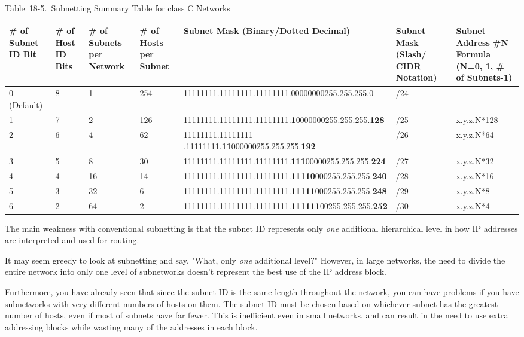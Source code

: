\documentclass[b5paper,11pt]{memoir}
\begin{document}
\protect\hypertarget{ch18s07.htmlux5cux23subnetting_summary_table_for_class_c_net}{}{}

Table~18-5.~Subnetting Summary Table for class C Networks

\begin{longtable}[]{@{}lllllll@{}}
\toprule
\# of Subnet ID Bit & \# of Host ID Bits & \# of Subnets per Network &
\# of Hosts per Subnet & Subnet Mask (Binary/Dotted Decimal) & Subnet
Mask (Slash/ CIDR Notation) & Subnet Address \#N Formula (N=0, 1, \# of
Subnets-1)\tabularnewline
\midrule
\endhead
0 (Default) & 8 & 1 & 254 &
11111111.11111111.11111111.00000000255.255.255.0 & /24 &
---\tabularnewline
1 & 7 & 2 & 126 &
11111111.11111111.11111111.{\textbf{1}}0000000255.255.255.{\textbf{128}}
& /25 & x.y.z.N*128\tabularnewline
2 & 6 & 4 & 62 & 11111111.11111111
.11111111.{\textbf{11}}000000255.255.255.{\textbf{192}} & /26 &
x.y.z.N*64\tabularnewline
3 & 5 & 8 & 30 &
11111111.11111111.11111111.{\textbf{111}}00000255.255.255.{\textbf{224}}
& /27 & x.y.z.N*32\tabularnewline
4 & 4 & 16 & 14 &
11111111.11111111.11111111.{\textbf{11110}}000255.255.255.{\textbf{240}}
& /28 & x.y.z.N*16\tabularnewline
5 & 3 & 32 & 6 &
11111111.11111111.11111111.{\textbf{11111}}000255.255.255.{\textbf{248}}
& /29 & x.y.z.N*8\tabularnewline
6 & 2 & 64 & 2 &
11111111.11111111.11111111.{\textbf{111111}}00255.255.255.{\textbf{252}}
& /30 & x.y.z.N*4\tabularnewline
\bottomrule
\end{longtable}

\protect\hypertarget{ch18s08.html}{}{}

\protect\hypertarget{ch18s08.htmlux5cux23idx-CHP-18-0742}{}{}The main
weakness with conventional subnetting is that the subnet ID represents
only {\emph{one}} additional hierarchical level in how IP addresses are
interpreted and used for routing.

It may seem greedy to look at subnetting and say, "What, only
{\emph{one}} additional level?" However, in large networks, the need to
divide the entire network into only one level of subnetworks doesn't
represent the best use of the IP address block.

Furthermore, you have already seen that since the subnet ID is the same
length throughout the network, you can have problems if you have
subnetworks with very different numbers of hosts on them. The subnet ID
must be chosen based on whichever subnet has the greatest number of
hosts, even if most of subnets have far fewer. This is inefficient even
in small networks, and can result in the need to use extra addressing
blocks while wasting many of the addresses in each block.
\end{document}
